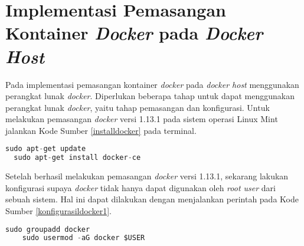   \section{Implementasi Pemasangan Kontainer \textit{Docker} pada \textit{Docker Host}}
  Pada implementasi pemasangan kontainer \textit{docker} pada \textit{docker host} menggunakan perangkat lunak \textit{docker}. Diperlukan beberapa tahap untuk dapat menggunakan perangkat lunak \textit{docker}, yaitu tahap pemasangan dan konfigurasi. Untuk melakukan pemasangan \textit{docker} versi 1.13.1 pada sistem operasi Linux Mint jalankan Kode Sumber \ref{installdocker} pada terminal.
  \newline
  \begin{minipage}{\linewidth}
  \begin{lstlisting}[caption=Perintah untuk installasi Docker,language=Python,label=installdocker]
  sudo apt-get update
  sudo apt-get install docker-ce
  \end{lstlisting}
  \end{minipage}
  
  Setelah berhasil melakukan pemasangan \textit{docker} versi 1.13.1, sekarang lakukan konfigurasi supaya \textit{docker} tidak hanya dapat digunakan oleh \textit{root user} dari sebuah sistem. Hal ini dapat dilakukan dengan menjalankan perintah pada Kode Sumber \ref{konfigurasildocker1}.
  \newline
    \begin{minipage}{\linewidth}
	\begin{lstlisting}[caption=Perintah untuk installasi Ansible,language=Python,label=konfigurasildocker1]
	sudo groupadd docker
	sudo usermod -aG docker $USER
	\end{lstlisting}
	\end{minipage}
	
